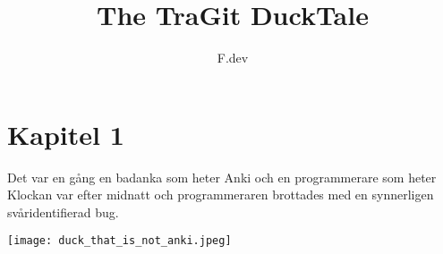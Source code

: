 \documentclass[a4paper]{article}
\begin{document}
\title{The TraGit DuckTale}
\author{F.dev}
\maketitle

\section*{Kapitel 1}
Det var en gång en badanka som heter Anki och en programmerare som heter %
Klockan var efter midnatt och programmeraren brottades med en synnerligen svåridentifierad bug.

\begin{center}
	\texttt{[image: duck\_that\_is\_not\_anki.jpeg]}
\end{center}


\end{document}
